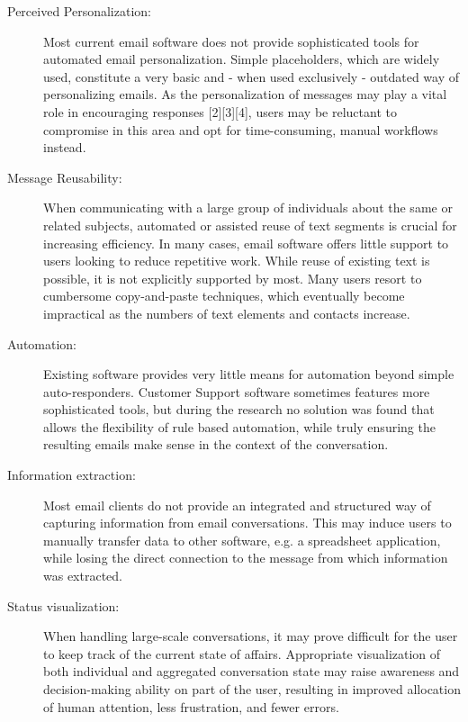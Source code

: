 \begin{description}

\item[Perceived Personalization:] Most current email software does not provide sophisticated tools for automated email personalization. Simple placeholders, which are widely used, constitute a very basic and - when used exclusively - outdated way of personalizing emails. As the personalization of messages may play a vital role in encouraging responses [2][3][4], users may be reluctant to compromise in this area and opt for time-consuming, manual workflows instead.

\item[Message Reusability:] When communicating with a large group of individuals about the same or related subjects, automated or assisted reuse of text segments is crucial for increasing efficiency. In many cases, email software offers little support to users looking to reduce repetitive work. While reuse of existing text is possible, it is not explicitly supported by most. Many users resort to cumbersome copy-and-paste techniques, which eventually become impractical as the numbers of text elements and contacts increase.

\item[Automation:] Existing software provides very little means for automation beyond simple auto-responders. Customer Support software sometimes features more sophisticated tools, but during the research no solution was found that allows the flexibility of rule based automation, while truly ensuring the resulting emails make sense in the context of the conversation.

\item[Information extraction:] Most email clients do not provide an integrated and structured way of capturing information from email conversations. This may induce users to manually transfer data to other software, e.g. a spreadsheet application, while losing the direct connection to the message from which information was extracted.

\item[Status visualization:] When handling large-scale conversations, it may prove difficult for the user to keep track of the current state of affairs. Appropriate visualization of both individual and aggregated conversation state may raise awareness and decision-making ability on part of the user, resulting in improved allocation of human attention, less frustration, and fewer errors.

\end{description}

